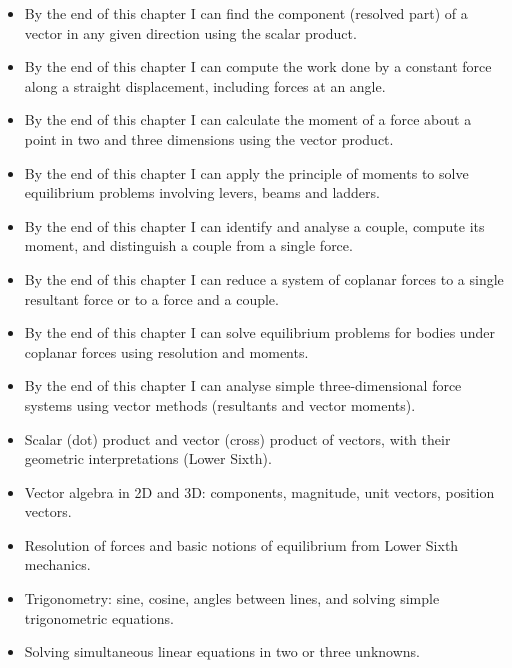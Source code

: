 \documentclass[11pt]{article}
\begin{document}
\begin{objectifs}
\begin{itemize}
\item By the end of this chapter I can find the component (resolved part) of a vector in any given direction using the scalar product.
\item By the end of this chapter I can compute the work done by a constant force along a straight displacement, including forces at an angle.
\item By the end of this chapter I can calculate the moment of a force about a point in two and three dimensions using the vector product.
\item By the end of this chapter I can apply the principle of moments to solve equilibrium problems involving levers, beams and ladders.
\item By the end of this chapter I can identify and analyse a couple, compute its moment, and distinguish a couple from a single force.
\item By the end of this chapter I can reduce a system of coplanar forces to a single resultant force or to a force and a couple.
\item By the end of this chapter I can solve equilibrium problems for bodies under coplanar forces using resolution and moments.
\item By the end of this chapter I can analyse simple three-dimensional force systems using vector methods (resultants and vector moments).
\end{itemize}
\end{objectifs}

\begin{prerequis}
\begin{itemize}
\item Scalar (dot) product and vector (cross) product of vectors, with their geometric interpretations (Lower Sixth).
\item Vector algebra in 2D and 3D: components, magnitude, unit vectors, position vectors.
\item Resolution of forces and basic notions of equilibrium from Lower Sixth mechanics.
\item Trigonometry: sine, cosine, angles between lines, and solving simple trigonometric equations.
\item Solving simultaneous linear equations in two or three unknowns.
\end{itemize}
\end{prerequis}
\end{document}
